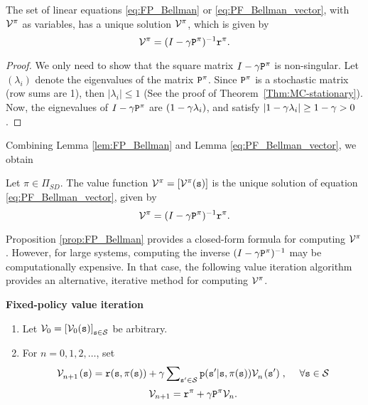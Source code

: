 \begin{lemma}\label{lem:FP_Bellman_sol}
The set of linear equations \eqref{eq:FP_Bellman} or
\eqref{eq:PF_Bellman_vector}, with ${\mathcal{V}^\pi }$ as variables,
has a unique solution ${\mathcal{V}^\pi }$, which is given by
\[{\mathcal{V}^\pi } = {(I - \gamma {{\tt P}^\pi})^{ -
1}}{{\tt r}^\pi }.\]
\end{lemma}
\begin{proof}
We only need to show that the square matrix $I - \gamma
{{\tt P}^\pi}$ is non-singular.  Let $({\lambda _i})$ denote the
eigenvalues of the matrix ${{\tt P}^\pi }$. Since ${{\tt P}^\pi }$ is a
stochastic matrix (row sums are 1), then $|{\lambda _i}| \le 1$ (See the proof of Theorem~\ref{Thm:MC-stationary}).
Now, the eignevalues of $I - \gamma {{\tt P}^\pi}$ are $(1 -
\gamma {\lambda _i})$, and satisfy $|1 - \gamma {\lambda _i}|
\ge 1 - \gamma  > 0$.
\end{proof}

Combining Lemma \ref{lem:FP_Bellman} and Lemma \ref{eq:PF_Bellman_vector}, we obtain

\begin{proposition}\label{prop:FP_Bellman}
Let $\pi\in \Pi_{SD}$. The value function ${\mathcal{V}^\pi } =
[{\mathcal{V}^\pi }({\tt s})]$ is the unique solution of equation
\eqref{eq:PF_Bellman_vector}, given by \[{\mathcal{V}^\pi } = {(I -
\gamma {{\tt P}^\pi})^{ - 1}}{{\tt r}^\pi }.\]
\end{proposition}

Proposition \ref{prop:FP_Bellman} provides a closed-form formula for
computing $\mathcal{V}_{}^\pi$. However, for large systems, computing
the inverse ${(I - \gamma {{\tt P}^\pi})^{ - 1}}$ may be
computationally expensive. In that case, the following value
iteration algorithm provides an alternative, iterative method for
computing $\mathcal{V}_{}^\pi$.

\begin{algorithm_}\textbf{Fixed-policy value iteration}
\begin{enumerate}
  \item Let ${\mathcal{V}_0} = {\left[{\mathcal{V}_0}({\tt s})\right]_{{\tt s} \in \mathcal{S}}}$ be arbitrary.
  \item For $n = 0,1,2, \ldots $, set
\[\mathcal{V}_{n + 1}^{}{\kern 1pt} ({\tt s}) = {\tt r}({\tt s},\pi ({\tt s})) + \gamma \sum\nolimits_{{\tt s}' \in \mathcal{S}} {{\tt p}({\tt s}'|{\tt s},\pi ({\tt s}))\mathcal{V}_n^{}{\kern 1pt} ({\tt s}')} \;,\quad \;\forall {\tt s} \in \mathcal{S}\]
\[{\mathcal{V}_{n + 1}} = {{\tt r}^\pi } + \gamma {{\tt P}^\pi}{\mathcal{V}_n}.\]
\end{enumerate}
\end{algorithm_}

